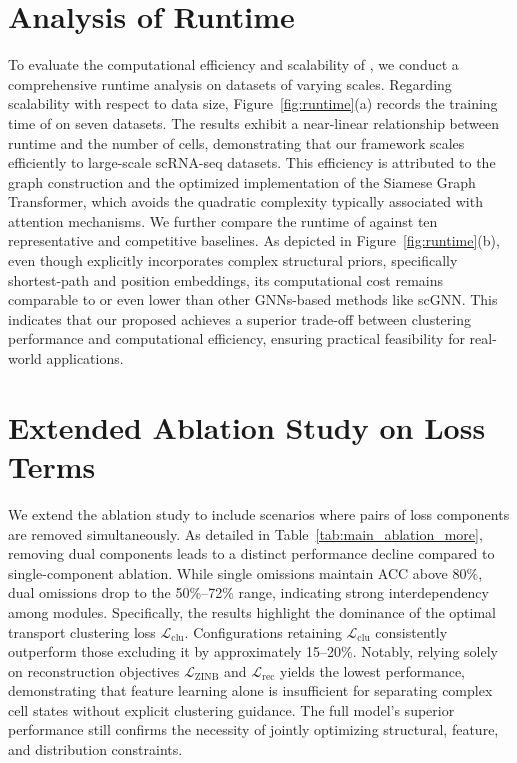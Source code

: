\begin{appendix}
\section{Analysis of Runtime}
\label{sec:runtime}
To evaluate the computational efficiency and scalability of \method{}, we conduct a comprehensive runtime analysis on datasets of varying scales. Regarding scalability with respect to data size, Figure~\ref{fig:runtime}(a) records the training time of \method{} on seven datasets. The results exhibit a near-linear relationship between runtime and the number of cells, demonstrating that our framework scales efficiently to large-scale scRNA-seq datasets. This efficiency is attributed to the graph construction and the optimized implementation of the Siamese Graph Transformer, which avoids the quadratic complexity typically associated with attention mechanisms. We further compare the runtime of \method{} against ten representative and competitive baselines. As depicted in Figure~\ref{fig:runtime}(b), even though \method{} explicitly incorporates complex structural priors, specifically shortest-path and position embeddings, its computational cost remains comparable to or even lower than other GNNs-based methods like scGNN. This indicates that our proposed \method{} achieves a superior trade-off between clustering performance and computational efficiency, ensuring practical feasibility for real-world applications.


\section{Extended Ablation Study on Loss Terms}
\label{sec:extended_ablation}
We extend the ablation study to include scenarios where pairs of loss components are removed simultaneously. As detailed in Table~\ref{tab:main_ablation_more}, removing dual components leads to a distinct performance decline compared to single-component ablation. While single omissions maintain ACC above 80\%, dual omissions drop to the 50\%--72\% range, indicating strong interdependency among modules. Specifically, the results highlight the dominance of the optimal transport clustering loss $\mathcal{L}_{\text{clu}}$. Configurations retaining $\mathcal{L}_{\text{clu}}$ consistently outperform those excluding it  by approximately 15--20\%. Notably, relying solely on reconstruction objectives $\mathcal{L}_{\text{ZINB}}$ and $\mathcal{L}_{\text{rec}}$ yields the lowest performance, demonstrating that feature learning alone is insufficient for separating complex cell states without explicit clustering guidance. The full model's superior performance still confirms the necessity of jointly optimizing structural, feature, and distribution constraints.


\end{appendix}
